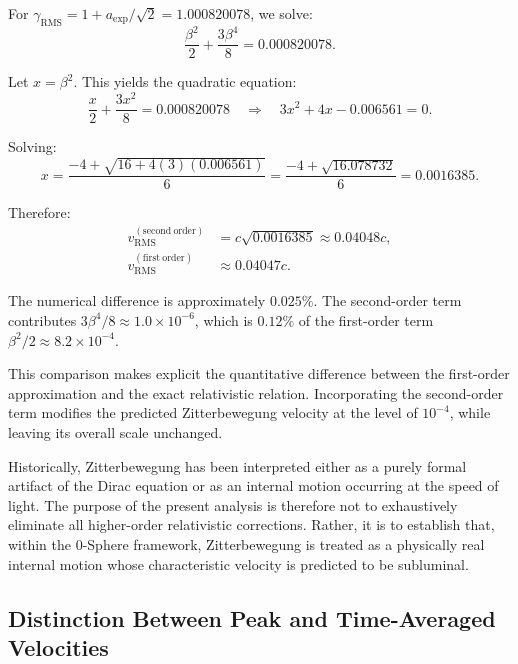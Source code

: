 \documentclass[12pt,letterpaper]{article}
\begin{document}
For $\gamma_{\mathrm{RMS}} = 1 + a_{\mathrm{exp}}/\sqrt{2} = 1.000820078$, we solve:
\begin{equation}
\frac{\beta^2}{2} + \frac{3\beta^4}{8} = 0.000820078.
\end{equation}

Let $x = \beta^2$. This yields the quadratic equation:
\begin{equation}
\frac{x}{2} + \frac{3x^2}{8} = 0.000820078 \quad \Rightarrow \quad 3x^2 + 4x - 0.006561 = 0.
\end{equation}

Solving:
\begin{equation}
x = \frac{-4 + \sqrt{16 + 4(3)(0.006561)}}{6} = \frac{-4 + \sqrt{16.078732}}{6} = 0.0016385.
\end{equation}

Therefore:
\begin{align}
v_{\mathrm{RMS}}^{(\mathrm{second\ order})} &= c\sqrt{0.0016385} \approx 0.04048c, \\
v_{\mathrm{RMS}}^{(\mathrm{first\ order})} &\approx 0.04047c.
\end{align}

The numerical difference is approximately $0.025\%$. The second-order term contributes $3\beta^4/8 \approx 1.0 \times 10^{-6}$, which is $0.12\%$ of the first-order term $\beta^2/2 \approx 8.2 \times 10^{-4}$.

This comparison makes explicit the quantitative difference between the first-order approximation and the exact relativistic relation. Incorporating the second-order term modifies the predicted Zitterbewegung velocity at the level of $10^{-4}$, while leaving its overall scale unchanged.

Historically, Zitterbewegung has been interpreted either as a purely formal artifact of the Dirac equation or as an internal motion occurring at the speed of light. The purpose of the present analysis is therefore not to exhaustively eliminate all higher-order relativistic corrections. Rather, it is to establish that, within the 0-Sphere framework, Zitterbewegung is treated as a physically real internal motion whose characteristic velocity is predicted to be subluminal.


\subsection{Distinction Between Peak and Time-Averaged Velocities}
\end{document}
